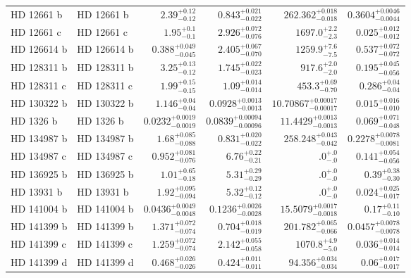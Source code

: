 \begin{longtable*}{llrrrr}
HD 12661 b & HD 12661 b & $2.39^{+0.12}_{-0.12}$ & $0.843^{+0.021}_{-0.022}$ & $262.362^{+0.018}_{-0.018}$ & $0.3604^{+0.0046}_{-0.0044}$ \\ 
HD 12661 c & HD 12661 c & $1.95^{+0.1}_{-0.1}$ & $2.926^{+0.072}_{-0.076}$ & $1697.0^{+2.2}_{-2.3}$ & $0.025^{+0.012}_{-0.012}$ \\ 
HD 126614 b & HD 126614 b & $0.388^{+0.049}_{-0.045}$ & $2.405^{+0.067}_{-0.070}$ & $1259.9^{+7.6}_{-7.5}$ & $0.537^{+0.072}_{-0.072}$ \\ 
HD 128311 b & HD 128311 b & $3.25^{+0.13}_{-0.12}$ & $1.745^{+0.022}_{-0.023}$ & $917.6^{+2.0}_{-2.0}$ & $0.195^{+0.045}_{-0.056}$ \\ 
HD 128311 c & HD 128311 c & $1.99^{+0.15}_{-0.15}$ & $1.09^{+0.014}_{-0.014}$ & $453.3^{+0.69}_{-0.70}$ & $0.286^{+0.04}_{-0.04}$ \\ 
HD 130322 b & HD 130322 b & $1.146^{+0.04}_{-0.04}$ & $0.0928^{+0.0013}_{-0.0013}$ & $10.70867^{+0.00017}_{-0.00017}$ & $0.015^{+0.016}_{-0.010}$ \\ 
HD 1326 b & HD 1326 b & $0.0232^{+0.0019}_{-0.0019}$ & $0.0839^{+0.00094}_{-0.00096}$ & $11.4429^{+0.0013}_{-0.0013}$ & $0.069^{+0.071}_{-0.048}$ \\ 
HD 134987 b & HD 134987 b & $1.68^{+0.085}_{-0.088}$ & $0.831^{+0.020}_{-0.022}$ & $258.248^{+0.043}_{-0.042}$ & $0.2278^{+0.0078}_{-0.0081}$ \\ 
HD 134987 c & HD 134987 c & $0.952^{+0.081}_{-0.076}$ & $6.76^{+0.22}_{-0.21}$ & $.0^{+.0}_{-.0}$ & $0.141^{+0.054}_{-0.056}$ \\ 
HD 136925 b & HD 136925 b & $1.01^{+0.65}_{-0.18}$ & $5.31^{+0.29}_{-0.29}$ & $.0^{+.0}_{-.0}$ & $0.39^{+0.38}_{-0.30}$ \\ 
HD 13931 b & HD 13931 b & $1.92^{+0.095}_{-0.094}$ & $5.32^{+0.12}_{-0.12}$ & $.0^{+.0}_{-.0}$ & $0.024^{+0.025}_{-0.017}$ \\ 
HD 141004 b & HD 141004 b & $0.0436^{+0.0049}_{-0.0048}$ & $0.1236^{+0.0026}_{-0.0028}$ & $15.5079^{+0.0017}_{-0.0018}$ & $0.17^{+0.11}_{-0.10}$ \\ 
HD 141399 b & HD 141399 b & $1.371^{+0.072}_{-0.074}$ & $0.704^{+0.018}_{-0.019}$ & $201.782^{+0.065}_{-0.066}$ & $0.0457^{+0.0078}_{-0.0078}$ \\ 
HD 141399 c & HD 141399 c & $1.259^{+0.072}_{-0.074}$ & $2.142^{+0.055}_{-0.058}$ & $1070.8^{+4.9}_{-5.0}$ & $0.036^{+0.014}_{-0.014}$ \\ 
HD 141399 d & HD 141399 d & $0.468^{+0.026}_{-0.026}$ & $0.424^{+0.011}_{-0.011}$ & $94.356^{+0.034}_{-0.034}$ & $0.06^{+0.017}_{-0.017}$ \\ 

\end{longtable*}
